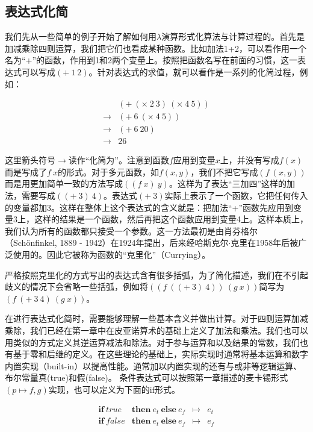 \documentclass[UTF8]{article}
\begin{document}
\subsection{表达式化简}
我们先从一些简单的例子开始了解如何用$\lambda$演算形式化算法与计算过程的。首先是加减乘除四则运算，我们把它们也看成某种函数。比如加法1+2，可以看作用一个名为“+”的函数，作用到1和2两个变量上。按照把函数名写在前面的习惯，这一表达式可以写成$(+\ 1\ 2)$。针对表达式的求值，就可以看作是一系列的化简过程，例如：

\[
\begin{array}{ll}
    & (+\ (\times\ 2\ 3)\ (\times\ 4\ 5)) \\
\to & (+\ 6\ (\times\ 4\ 5)) \\
\to & (+\ 6\ 20) \\
\to & 26
\end{array}
\]

这里箭头符号$\to$读作“化简为”。注意到函数$f$应用到变量$x$上，并没有写成$f(x)$而是写成了$f\ x$的形式。对于多元函数，如$f(x, y)$，我们不把它写成$(f\ (x, y))$而是用更加简单一致的方法写成$((f\ x)\ y)$。这样为了表达“三加四”这样的加法，需要写成$((+\ 3)\ 4)$。表达式$(+\ 3)$实际上表示了一个函数，它把任何传入的变量都加3。这样在整体上这个表达式的含义就是：把加法“+”函数先应用到变量3上，这样的结果是一个函数，然后再把这个函数应用到变量4上。这样本质上，我们认为所有的函数都只接受一个参数。这一方法最初是由肖芬格尔（Schönfinkel, 1889 - 1942）在1924年提出，后来经哈斯克尔$\cdot$克里在1958年后被广泛使用的。因此它被称为函数的“克里化”（Currying）\cite{SPJ1987}。

严格按照克里化的方式写出的表达式含有很多括弧，为了简化描述，我们在不引起歧义的情况下会省略一些括弧，例如将$((f\ ((+\ 3)\ 4))\ (g\ x))$简写为$(f\ (+\ 3\ 4)\ (g\ x))$。

在进行表达式化简时，需要能够理解一些基本含义并做出计算。对于四则运算加减乘除，我们已经在第一章中在皮亚诺算术的基础上定义了加法和乘法。我们也可以用类似的方式定义其逆运算减法和除法。对于参与运算和以及结果的常数，我们也有基于零和后继的定义。在这些理论的基础上，实际实现时通常将基本运算和数字内置实现（built-in）以提高性能。通常加以内置实现的还有与或非等逻辑运算、布尔常量真(true)和假(false)。 条件表达式可以按照第一章描述的麦卡锡形式$(p \mapsto f, g)$实现，也可以定义为下面的if形式。

\[
\begin{array}{llcl}
\textbf{if}\ true\! & \textbf{then}\ e_t\ \textbf{else}\ e_f & \mapsto & e_t \\
\textbf{if}\ false\! & \textbf{then}\ e_t\ \textbf{else}\ e_f & \mapsto & e_f
\end{array}
\]
\end{document}

